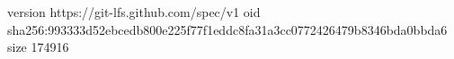 version https://git-lfs.github.com/spec/v1
oid sha256:993333d52ebcedb800e225f77f1eddc8fa31a3cc0772426479b8346bda0bbda6
size 174916

